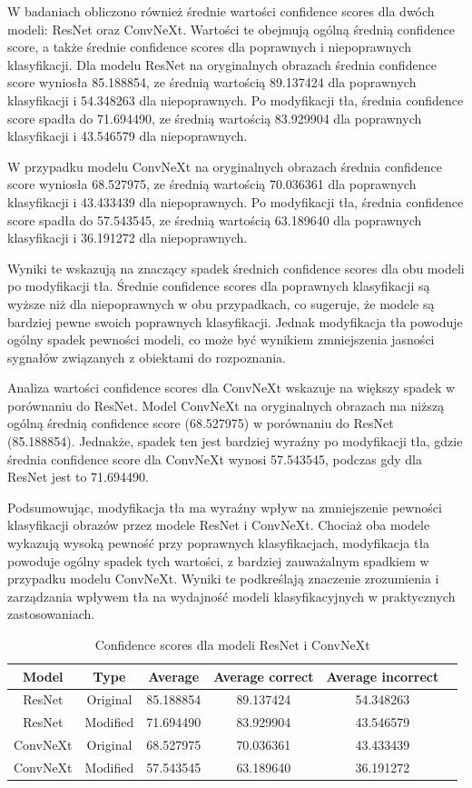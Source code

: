 W badaniach obliczono również średnie wartości confidence scores dla dwóch modeli: ResNet oraz ConvNeXt. Wartości te obejmują ogólną średnią 
confidence score, a także średnie confidence scores dla poprawnych i niepoprawnych klasyfikacji. Dla modelu ResNet na oryginalnych obrazach 
średnia confidence score wyniosła 85.188854, ze średnią wartością 89.137424 dla poprawnych klasyfikacji i 54.348263 dla niepoprawnych. Po 
modyfikacji tła, średnia confidence score spadła do 71.694490, ze średnią wartością 83.929904 dla poprawnych klasyfikacji i 43.546579 dla 
niepoprawnych.

W przypadku modelu ConvNeXt na oryginalnych obrazach średnia confidence score wyniosła 68.527975, ze średnią wartością 70.036361 dla poprawnych 
klasyfikacji i 43.433439 dla niepoprawnych. Po modyfikacji tła, średnia confidence score spadła do 57.543545, ze średnią wartością 63.189640 dla 
poprawnych klasyfikacji i 36.191272 dla niepoprawnych.

Wyniki te wskazują na znaczący spadek średnich confidence scores dla obu modeli po modyfikacji tła. Średnie confidence scores dla poprawnych 
klasyfikacji są wyższe niż dla niepoprawnych w obu przypadkach, co sugeruje, że modele są bardziej pewne swoich poprawnych klasyfikacji. Jednak 
modyfikacja tła powoduje ogólny spadek pewności modeli, co może być wynikiem zmniejszenia jasności sygnałów związanych z obiektami do 
rozpoznania.

Analiza wartości confidence scores dla ConvNeXt wskazuje na większy spadek w porównaniu do ResNet. Model ConvNeXt na oryginalnych obrazach ma 
niższą ogólną średnią confidence score (68.527975) w porównaniu do ResNet (85.188854). Jednakże, spadek ten jest bardziej wyraźny po modyfikacji 
tła, gdzie średnia confidence score dla ConvNeXt wynosi 57.543545, podczas gdy dla ResNet jest to 71.694490.

Podsumowując, modyfikacja tła ma wyraźny wpływ na zmniejszenie pewności klasyfikacji obrazów przez modele ResNet i ConvNeXt. Chociaż oba modele 
wykazują wysoką pewność przy poprawnych klasyfikacjach, modyfikacja tła powoduje ogólny spadek tych wartości, z bardziej zauważalnym spadkiem w 
przypadku modelu ConvNeXt. Wyniki te podkreślają znaczenie zrozumienia i zarządzania wpływem tła na wydajność modeli klasyfikacyjnych w 
praktycznych zastosowaniach.

\begin{table}
	\centering
	\begin{tabular}{|c|c|c|c|c|c|}
		\hline
		\textbf{Model} & \textbf{Type} & \textbf{Average} & 
		\textbf{Average correct} & \textbf{Average incorrect} \\
		\hline
		ResNet & Original & 85.188854 & 89.137424 & 54.348263 \\
		\hline
		ResNet & Modified & 71.694490 & 83.929904 & 43.546579  \\
		\hline
		ConvNeXt & Original & 68.527975 & 70.036361 & 43.433439 \\
		\hline
		ConvNeXt & Modified & 57.543545 & 63.189640 & 36.191272 \\
		\hline
	\end{tabular}
	\caption{Confidence scores dla modeli ResNet i ConvNeXt}
	\label{tab:model_confidence}
\end{table}

